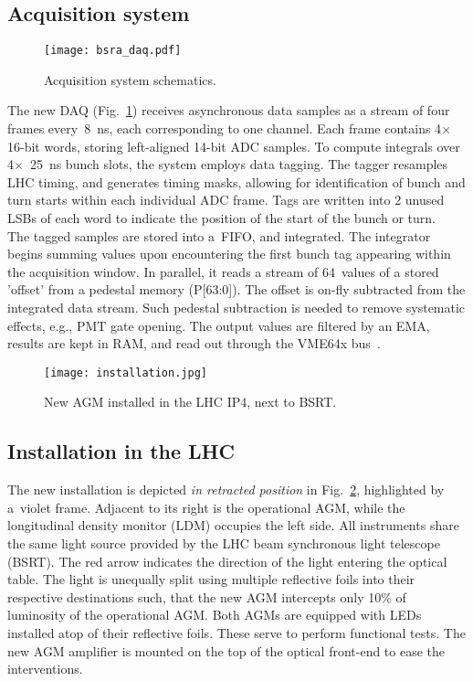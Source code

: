 \subsection{Acquisition system}
\begin{figure}[!tbh]
    \centering
    \texttt{[image: bsra\_daq.pdf]}
    \caption{Acquisition system schematics.}
    \label{fig:bsra_daq}
\end{figure}
%
The new DAQ (Fig.~\ref{fig:bsra_daq}) receives asynchronous data samples as a stream of four frames every~\SI{8}{\nano s}, each corresponding to one channel.
%
Each frame contains 4$\times$16-bit words, storing left-aligned 14-bit ADC samples. 
%
To compute integrals over 4$\times$~\SI{25}{\nano\second} bunch slots, the system employs data tagging. 
%
The tagger resamples LHC timing, and generates timing masks, allowing for identification of bunch and turn starts within each individual ADC frame.
%
Tags are written into 2 unused LSBs of each word to indicate the position of the start of the bunch or turn.
\\
%
The tagged samples are stored into a~FIFO, and integrated. 
%
The integrator begins summing values upon encountering the first bunch tag appearing within the acquisition window.
%
In parallel, it reads a stream of 64~values of a stored 'offset' from a pedestal memory (P[63:0]).
%
The offset is on-fly subtracted from the integrated data stream. 
%
Such pedestal subtraction is needed to remove systematic effects, e.g., PMT gate opening. 
%
The output values are filtered by an EMA, results are kept in RAM, and read out through the VME64x bus~\cite{my_thesis}.

\begin{figure}[!tbh]
    \centering
    \texttt{[image: installation.jpg]}
    \caption{New AGM installed in the LHC IP4, next to BSRT.}
    \label{fig:installation}
\end{figure}

\subsection{Installation in the LHC}

The new installation is depicted \textit{in retracted position} in Fig.~\ref{fig:installation}, highlighted by a~violet frame.
%
Adjacent to its right is the operational AGM, while the longitudinal density monitor (LDM) occupies the left side.
%
All instruments share the same light source provided by the LHC beam synchronous light telescope (BSRT).
%
The red arrow indicates the direction of the light entering the optical table.
%
The light is unequally split using multiple reflective foils into their respective destinations such, that the new AGM intercepts only 10\% of luminosity of the operational AGM.
%
Both AGMs are equipped with LEDs installed atop of their reflective foils.
%
These serve to perform functional tests.
%
The new AGM amplifier is mounted on the top of the optical front-end to ease the interventions.

